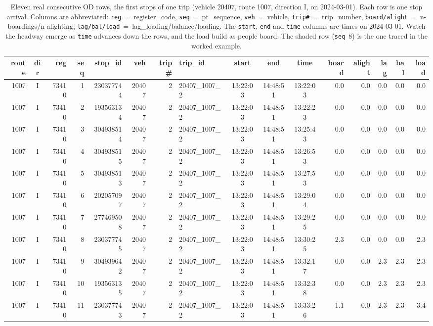 \documentclass[11pt,a4paper]{article}
\begin{document}
\begin{table}[H]
\centering
\setlength{\tabcolsep}{3pt}
\scriptsize
\caption{Eleven real consecutive OD rows, the first stops of one trip (vehicle 20407, route
1007, direction I, on 2024-03-01). Each row is one stop arrival. Columns are abbreviated:
\texttt{reg}~=~register\_code, \texttt{seq}~=~pt\_sequence, \texttt{veh}~=~vehicle,
\texttt{trip\#}~=~trip\_number, \texttt{board/alight}~=~n-boardings/n-alighting,
\texttt{lag/bal/load}~=~lag\_loading/balance/loading. The \texttt{start}, \texttt{end} and
\texttt{time} columns are times on 2024-03-01. Watch the headway emerge as \texttt{time} advances
down the rows, and the load build as people board. The shaded row (\texttt{seq}~8) is the one traced
in the worked example.}
\label{tab:odsample}
\begin{tabular}{rcrrrrrlcccrrrrr}
\toprule
route & dir & reg & seq & stop\_id & veh & trip\# & trip\_id & start & end & time & board & alight & lag & bal & load \\
\midrule
1007 & I & 73410 & 1  & 230377744 & 20407 & 2 & 20407\_1007\_2 & 13:22:03 & 14:48:51 & 13:22:03 & 0.0 & 0.0 & 0.0 & 0.0 & 0.0 \\
1007 & I & 73410 & 2  & 193563134 & 20407 & 2 & 20407\_1007\_2 & 13:22:03 & 14:48:51 & 13:22:23 & 0.0 & 0.0 & 0.0 & 0.0 & 0.0 \\
1007 & I & 73410 & 3  & 304938514 & 20407 & 2 & 20407\_1007\_2 & 13:22:03 & 14:48:51 & 13:25:43 & 0.0 & 0.0 & 0.0 & 0.0 & 0.0 \\
1007 & I & 73410 & 4  & 304938515 & 20407 & 2 & 20407\_1007\_2 & 13:22:03 & 14:48:51 & 13:26:53 & 0.0 & 0.0 & 0.0 & 0.0 & 0.0 \\
1007 & I & 73410 & 5  & 304938513 & 20407 & 2 & 20407\_1007\_2 & 13:22:03 & 14:48:51 & 13:27:53 & 0.0 & 0.0 & 0.0 & 0.0 & 0.0 \\
1007 & I & 73410 & 6  & 202057097 & 20407 & 2 & 20407\_1007\_2 & 13:22:03 & 14:48:51 & 13:29:04 & 0.0 & 0.0 & 0.0 & 0.0 & 0.0 \\
1007 & I & 73410 & 7  & 277469508 & 20407 & 2 & 20407\_1007\_2 & 13:22:03 & 14:48:51 & 13:29:25 & 0.0 & 0.0 & 0.0 & 0.0 & 0.0 \\
\rowcolor{gray!15} 1007 & I & 73410 & 8  & 230377745 & 20407 & 2 & 20407\_1007\_2 & 13:22:03 & 14:48:51 & 13:30:25 & 2.3 & 0.0 & 0.0 & 0.0 & 2.3 \\
1007 & I & 73410 & 9  & 304939642 & 20407 & 2 & 20407\_1007\_2 & 13:22:03 & 14:48:51 & 13:32:17 & 0.0 & 0.0 & 2.3 & 2.3 & 2.3 \\
1007 & I & 73410 & 10 & 193563135 & 20407 & 2 & 20407\_1007\_2 & 13:22:03 & 14:48:51 & 13:32:38 & 0.0 & 0.0 & 2.3 & 2.3 & 2.3 \\
1007 & I & 73410 & 11 & 230377743 & 20407 & 2 & 20407\_1007\_2 & 13:22:03 & 14:48:51 & 13:33:26 & 1.1 & 0.0 & 2.3 & 2.3 & 3.4 \\
\bottomrule
\end{tabular}
\end{table}
\end{document}
